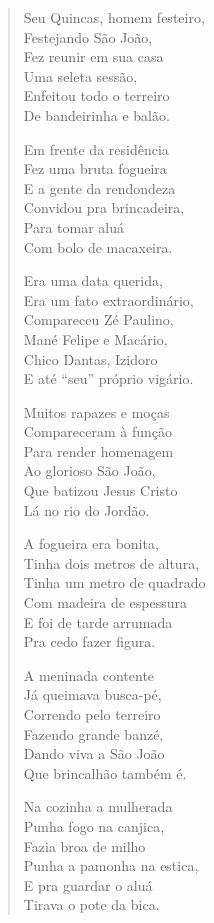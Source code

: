 \begin{verse}
Seu Quincas, homem festeiro, \\
Festejando São João,\\
Fez reunir em sua casa\\
Uma seleta sessão,\\
Enfeitou todo o terreiro\\
De bandeirinha e balão.

Em frente da residência\\
Fez uma bruta fogueira\\
E a gente da rendondeza\\
Convidou pra brincadeira,\\
Para tomar aluá\\
Com bolo de macaxeira.

Era uma data querida,\\
Era um fato extraordinário,\\
Compareceu Zé Paulino,\\
Mané Felipe e Macário, \\
Chico Dantas, Izidoro\\
E até “seu” próprio vigário.


Muitos rapazes e moças\\
Compareceram à função\\
Para render homenagem\\
Ao glorioso São João,\\
Que batizou Jesus Cristo\\
Lá no rio do Jordão.

A fogueira era bonita,\\
Tinha dois metros de altura,\\
Tinha um metro de quadrado\\
Com madeira de espessura\\
E foi de tarde arrumada\\
Pra cedo fazer figura.

A meninada contente\\
Já queimava busca-pé,\\
Correndo pelo terreiro\\
Fazendo grande banzé,\\
Dando viva a São João\\
Que brincalhão também é.

Na cozinha a mulherada\\
Punha fogo na canjica,\\
Fazia broa de milho\\
Punha a pamonha na estica,\\
E pra guardar o aluá\\
Tirava o pote da bica.



\end{verse}
